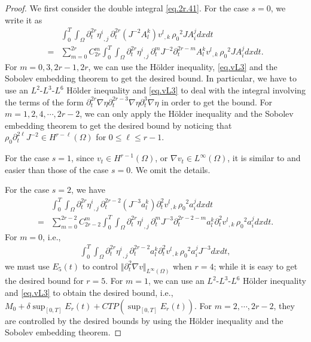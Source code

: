 \documentclass[12pt,twoside,reqno]{amsart}
\numberwithin{equation}{section}
\theoremstyle{definition}
\theoremstyle{remark}
\begin{document}
\begin{proof}
We first consider the double integral \eqref{eq.2r.41}. For the case $s=0$, we write it as
\begin{align*}
  &{\int_0^T\!\!\!\!\int_\Omega }{\partial}_t^{2r}{{{\eta^i}}_{,{j}}\,}{\partial}_t^{2r} (J^{-2}A_l^k) {{{v^l}}_{,{k}}\,}{\rho_0}^2  J A^j_i dxdt\\
  =&\sum_{m=0}^{2r}C_{2r}^m{\int_0^T\!\!\!\!\int_\Omega }{\partial}_t^{2r}{{{\eta^i}}_{,{j}}\,}{\partial}_t^{m} J^{-2}{\partial}_t^{2r-m}A_l^k {{{v^l}}_{,{k}}\,}{\rho_0}^2  J A^j_i dxdt.
\end{align*}
For $m=0,3, 2r-1,2r$, we can use the H\"older inequality, \eqref{eq.vL3} and the Sobolev embedding theorem to get the desired bound. In particular, we have to use an $L^2$-$L^3$-$L^6$ H\"older inequality and \eqref{eq.vL3} to deal with the integral involving the terms of the form ${\partial}_t^{2r}{\nabla}\eta {\partial}_t^{2r-3}{\nabla}\eta {\partial}_t^3{\nabla}\eta$ in order to get the bound. For $m=1,2,4,\cdots, 2r-2$, we can only apply the H\"older inequality and the Sobolev embedding theorem to get the desired bound by noticing that ${\rho_0} {\partial}_t^{2\ell}J^{-2}\in H^{r-\ell}(\Omega)$ for $0{\leqslant} \ell{\leqslant} r-1$.

For the case $s=1$, since $v_t\in H^{r-1}(\Omega)$, or ${\nabla} v_t\in L^\infty(\Omega)$, it is similar to and easier than those of the case $s=0$. We omit the details.

For the case $s=2$, we have
\begin{align*}
  &{\int_0^T\!\!\!\!\int_\Omega }{\partial}_t^{2r}{{{\eta^i}}_{,{j}}\,}{\partial}_t^{2r-2} (J^{-3}a_l^k){\partial}_t^2 {{{v^l}}_{,{k}}\,}{\rho_0}^2  a^j_i dxdt\\
  =&\sum_{m=0}^{2r-2}C_{2r-2}^m{\int_0^T\!\!\!\!\int_\Omega }{\partial}_t^{2r}{{{\eta^i}}_{,{j}}\,} {\partial}_t^m J^{-3}{\partial}_t^{2r-2-m} a_l^k{\partial}_t^2 {{{v^l}}_{,{k}}\,}{\rho_0}^2  a^j_i dxdt.
\end{align*}
For $m=0$, i.e.,
\begin{align}\label{eq.why5order}
  {\int_0^T\!\!\!\!\int_\Omega }{\partial}_t^{2r}{{{\eta^i}}_{,{j}}\,}{\partial}_t^{2r-2} a_l^k{\partial}_t^2 {{{v^l}}_{,{k}}\,}{\rho_0}^2  a^j_i J^{-3} dxdt,
\end{align}
we must use $E_5(t)$ to control ${\Vert{{\partial}_t^2{\nabla} v}\Vert}_{L^\infty(\Omega)}$ when $r=4$; while it is easy to get the desired bound for $r=5$. For $m=1$, we can use an $L^2$-$L^3$-$L^6$ H\"older inequality and \eqref{eq.vL3} to obtain the desired bound, i.e., $M_0+\delta\sup_{[0,T]}E_r(t)+CTP(\sup_{[0,T]}E_r(t))$. For $m=2,\cdots, 2r-2$, they are controlled by the desired bounds by using the H\"older inequality and the Sobolev embedding theorem.


\end{proof}
\end{document}
